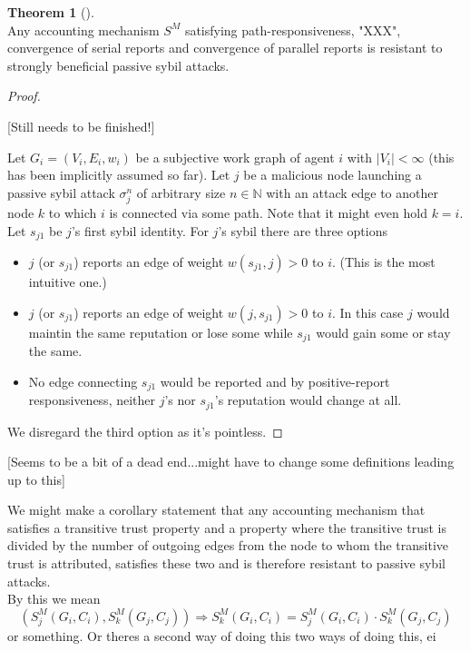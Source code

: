\documentclass[11pt,a4paper]{article}
\theoremstyle{definition}
\theoremstyle{theorem}
\newtheorem{theorem}{Theorem}[section]
\theoremstyle{proposition}
\theoremstyle{corollary}
\theoremstyle{lemma}
\theoremstyle{example}
\theoremstyle{remark}
\begin{document}
\begin{theorem}[]\ \\
Any accounting mechanism $S^M$ satisfying path-responsiveness, "XXX", convergence of serial reports and convergence of parallel reports is resistant to strongly beneficial passive sybil attacks. 
\end{theorem}
\begin{proof}

\begin{center}
[Still needs to be finished!] \vspace{1em}\\
\end{center}

\noindent{}Let $G_i=(V_i,E_i,w_i)$ be a subjective work graph of agent $i$ with $|V_i|<\infty$ (this has been implicitly assumed so far). Let $j$ be a malicious node launching a passive sybil attack $\sigma_j^n$ of arbitrary size $n\in\mathbb{N}$ with an attack edge to another node $k$ to which $i$ is connected via some path. Note that it might even hold $k=i$.  Let $s_{j1}$ be $j$'s first sybil identity. For $j$'s sybil there are three options
\begin{itemize}
\item $j$ (or $s_{j1}$) reports an edge of weight $w(s_{j1},j)>0$ to $i$. (This is the most intuitive one.)
\item $j$ (or $s_{j1}$) reports an edge of weight $w(j,s_{j1})>0$ to $i$. In this case $j$ would maintin the same reputation or lose some while $s_{j1}$ would gain some or stay the same.
\item No edge connecting $s_{j1}$ would be reported and by positive-report responsiveness, neither $j$'s nor $s_{j1}$'s reputation would change at all.
\end{itemize}
\noindent{}We disregard the third option as it's pointless. 
\end{proof}

\noindent{}\begin{center}[Seems to be a bit of a dead end...might have to change some definitions leading up to this]\end{center}
\noindent{}We might make a corollary statement that any accounting mechanism that satisfies a transitive trust property and a property where the transitive trust is divided by the number of outgoing edges from the node to whom the transitive trust is attributed, satisfies these two and is therefore resistant to passive sybil attacks. \vspace{1em}\\ 
\noindent{}By this we mean
\[
(S^M_j(G_i,C_i), S^M_k(G_j,C_j)) \Rightarrow{}S^M_k(G_i,C_i)=S^M_j(G_i,C_i)\cdot{}S^M_k(G_j,C_j)
\]
or something. Or theres a second way of doing this two ways of doing this, ei
\end{document}
